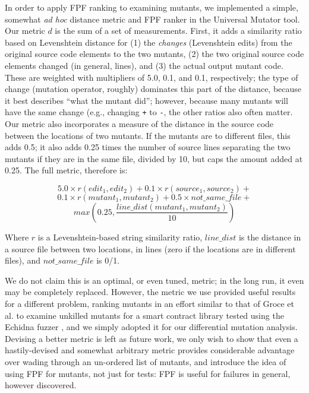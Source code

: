 In order to apply FPF ranking to examining mutants, we implemented a
simple, somewhat \emph{ad hoc} distance metric and FPF ranker in the
Universal Mutator \cite{universalmutator} tool.  Our metric $d$ is
the sum of a set of measurements.  First, it adds a similarity
ratio based on Levenshtein distance \cite{lev} for (1) the \emph{changes} (Levenshtein edits) from
the original source code elements to
the two mutants,  (2) the two original source code elements changed (in
general, lines), and (3) the actual output mutant code.  These are
weighted with multipliers of 5.0, 0.1, and 0.1, respectively; the type
of change (mutation operator, roughly) dominates this part of the
distance, because it best describes ``what the mutant did''; however,
because many mutants will have the same change (e.g., changing {\tt +}
to {\tt -}, the other ratios also often matter.
Our metric also incorporates a measure of the distance in the source
code between the locations of two mutants.  If the mutants are to
different files, this adds 0.5; it also adds 0.25
times the number of source lines separating the two mutants if they
are in the same file, divided by 10, but caps the amount added at
0.25.  The full metric, therefore is:

$$ 5.0 \times r(\mathit{edit}_1, \mathit{edit}_2) + 0.1 \times r(\mathit{source}_1, \mathit{source}_2) +$$
$$0.1 \times r(\mathit{mutant}_1, \mathit{mutant}_2) + 0.5 \times \mathit{not\_same\_file} +$$
$$max(0.25, \frac{\mathit{line\_dist}(\mathit{mutant}_1, \mathit{mutant}_2)}{10})$$

\noindent Where $r$ is a Levenshtein-based string similarity ratio,
$\mathit{line\_dist}$ is the distance in a source file between
two locations, in lines (zero if the locations are in different
files), and $\mathit{not\_same\_file}$ is 0/1.

We do not claim this is an optimal, or even tuned, metric; in the long
run, it even may be completely replaced.  However, the metric we use
provided useful results for a different problem, ranking mutants in an
effort similar to that of Groce et
al. \cite{groce2015verified,groce2018verified} to examine unkilled
mutants for a smart contract library tested using the Echidna fuzzer \cite{echidna-code},
and we simply adopted it for our differential mutation analysis.
Devising a better metric is left as future work, we only wish to show
that even a hastily-devised and somewhat arbitrary metric provides
considerable advantage over wading through an un-ordered list of
mutants, and introduce the idea of using FPF for mutants, not just for tests: FPF is useful for failures in general, however discovered.
